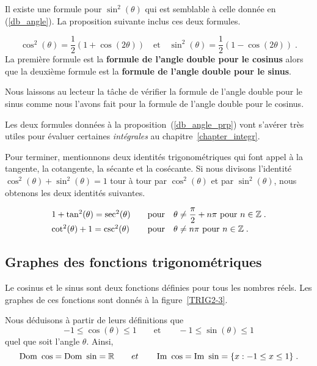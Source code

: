 {Il existe une formule pour $\sin^2(\theta)$ qui est
semblable à celle donnée en (\ref{db_angle}).  La proposition suivante
inclus ces deux formules. 

\begin{prop}
\[
\cos^2(\theta) = \frac{1}{2} \left( 1 + \cos(2\theta) \right)
\quad \text{et} \quad 
\sin^2(\theta) = \frac{1}{2} \left( 1 - \cos(2\theta) \right) \; .
\]
La première formule est la {\bfseries formule de l'angle double pour
le cosinus} alors que la deuxième formule est la {\bfseries formule de
l'angle double pour le sinus}. \label{db_angle_prp}
\end{prop}

Nous laissons au lecteur la tâche de vérifier la formule de l'angle
double pour le sinus comme nous l'avons fait pour la formule de l'angle
double pour le cosinus.

\begin{rmk}
Les deux formules données à la proposition~(\ref{db_angle_prp}) vont
s'avérer très utiles pour évaluer certaines {\em intégrales} au
chapitre~\ref{chapter_integr}.
\end{rmk}

Pour terminer, mentionnons deux identités trigonométriques qui
font appel à la tangente, la cotangente, la sécante et la cosécante.
Si nous divisons l'identité $\cos^2(\theta) + \sin^2(\theta) = 1$ tour
à tour par $\cos^2(\theta)$ et par $\sin^2(\theta)$, nous obtenons les
deux identités suivantes.

\begin{prop}
\[
\begin{array}{ll}
1 + \tan^2(\theta) = \sec^2(\theta) &\quad \text{pour} \quad \theta \neq
\displaystyle \frac{\pi}{2} + n \pi \ \text{pour} \ n \in \mathbb{Z} \; . \\[0.5em]
\cot^2(\theta) + 1 = \csc^2(\theta) &\quad \text{pour} \quad \theta \neq
n \pi \ \text{pour} \ n \in \mathbb{Z} \; .
\end{array}
\]
\end{prop}

\subsection{Graphes des fonctions trigonométriques}

Le cosinus et le sinus sont deux fonctions définies pour tous les
nombres réels.  Les graphes de ces fonctions sont donnés à la
figure~\ref{TRIG2-3}.

Nous déduisons à partir de leurs définitions que
\[
-1 \leq \cos(\theta) \leq 1 \qquad \text{et} \qquad
-1 \leq \sin(\theta) \leq 1
\]
quel que soit l'angle $\theta$.   Ainsi,
\[
\DO \cos = \DO \sin = \RR \qquad et \qquad
\IM \cos = \IM \sin = \{ x : -1 \leq x \leq 1 \} \; .
\]

}
